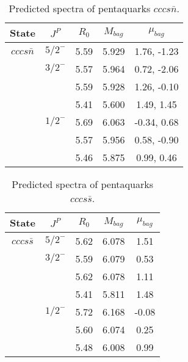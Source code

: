 \documentclass[prd,twocolumn,floatfix,nofootinbib]{revtex4}
\begin{document}
\renewcommand{\tabcolsep}{0.5cm}
\renewcommand{\arraystretch}{1.2}
\begin{table*}[!htbp]
    \caption{Predicted spectra of pentaquarks $cccs\bar{n}$.}
    \begin{tabular}{ccccc}
        \hline\hline
        {\rm State} &$J^{P}$ &$R_{0}$ &$M_{bag}$ &$\mu_{bag}$ \\ \hline
        ${cccs\bar{n}}$
            &${5/2}^{-}$    &5.59   &5.929  &1.76, -1.23 \\
            &${3/2}^{-}$    &5.57   &5.964  &0.72, -2.06 \\
            &               &5.59   &5.928  &1.26, -0.10 \\
            &               &5.41   &5.600  &1.49, 1.45 \\
            &${1/2}^{-}$    &5.69   &6.063  &-0.34, 0.68 \\
            &               &5.57   &5.956  &0.58, -0.90 \\
            &               &5.46   &5.875  &0.99, 0.46 \\
        \hline\hline
    \end{tabular}
\end{table*}

\renewcommand{\tabcolsep}{0.5cm}
\renewcommand{\arraystretch}{1.2}
\begin{table*}[!htbp]
    \caption{Predicted spectra of pentaquarks $cccs\bar{s}$.}
    \begin{tabular}{ccccc}
        \hline\hline
        {\rm State} &$J^{P}$ &$R_{0}$ &$M_{bag}$ &$\mu_{bag}$ \\ \hline
        ${cccs\bar{s}}$
            &${5/2}^{-}$    &5.62   &6.078  &1.51 \\
            &${3/2}^{-}$    &5.59   &6.079  &0.53 \\
            &               &5.62   &6.078  &1.11 \\
            &               &5.41   &5.811  &1.48 \\
            &${1/2}^{-}$    &5.72   &6.168  &-0.08 \\
            &               &5.60   &6.074  &0.25 \\
            &               &5.48   &6.008  &0.99 \\
        \hline\hline
    \end{tabular}
\end{table*}
\end{document}
